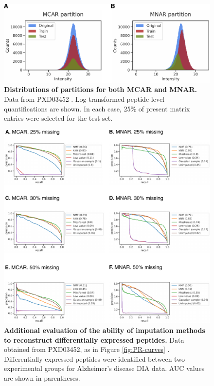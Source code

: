 \documentclass{article}
\begin{document}
\begin{figure}
  \centering
  \includegraphics[width=1.0\textwidth]{figures/partition-distributions-figure-v1.pdf}
  \caption{{\bf Distributions of partitions for both MCAR and MNAR.} Data from PXD03452 \cite{smtg-maccoss}. Log-transformed peptide-level quantifications are shown. In each case, 25\% of present matrix entries were selected for the test set.}
  \label{fig:partitions}
\end{figure} 

\begin{figure}
  \centering
  \includegraphics[width=1.0\textwidth]{figures/DE-testing-extended-v3.pdf}
  \caption{{\bf Additional evaluation of the ability of imputation methods to reconstruct differentially expressed peptides.} Data obtained from PXD03452, as in Figure \ref{fig:PR-curves} \cite{smtg-maccoss}. Differentially expressed peptides were identified between two experimental groups for Alzheimer's disease DIA data. AUC values are shown in parentheses.}
  \label{fig:DE-extended}
\end{figure}
\end{document}
